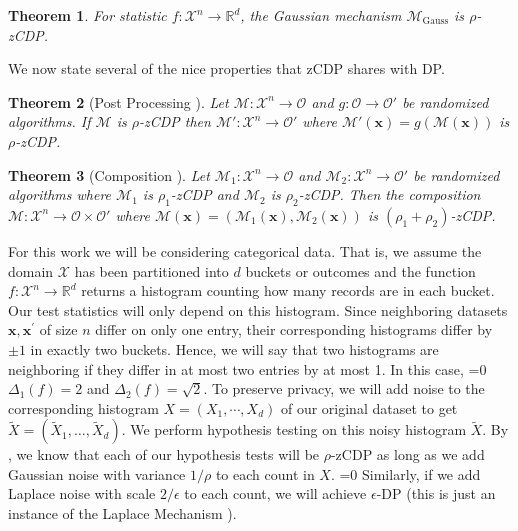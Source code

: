 \documentclass[twoside,letterpaper]{article} \usepackage{aistats2017}
\newtheorem{theorem}{Theorem}[section]
\theoremstyle{definition}
\theoremstyle{remark}
\begin{document}
\begin{theorem}
For statistic $f: {\mathcal{X}}^n \to {\mathbb{R}}^d$, the Gaussian mechanism ${{\mathcal{M}}_{\text{Gauss}}}$ is $\rho$-zCDP.
\label{thm:gauss_mech}
\end{theorem}

We now state several of the nice properties that zCDP shares with DP.  

\begin{theorem}[Post Processing \citep{BS16}]\label{thm:post}
Let ${\mathcal{M}}: {\mathcal{X}}^n \to {\mathcal{O}}$ and $g: {\mathcal{O}} \to {\mathcal{O}}'$ be randomized algorithms.  If ${\mathcal{M}}$ is $\rho$-zCDP then ${\mathcal{M}}': {\mathcal{X}}^n \to {\mathcal{O}}'$ where ${\mathcal{M}}'({\mathbf{x}}) = g({\mathcal{M}}({\mathbf{x}}))$ is $\rho$-zCDP.  
\end{theorem}
\begin{theorem}[Composition \citep{BS16}]
Let ${\mathcal{M}}_1: {\mathcal{X}}^n \to {\mathcal{O}}$ and ${\mathcal{M}}_2: {\mathcal{X}}^n \to {\mathcal{O}}'$ be randomized algorithms where ${\mathcal{M}}_1$ is $\rho_1$-zCDP and ${\mathcal{M}}_2$ is $\rho_2$-zCDP.  Then the composition ${\mathcal{M}}: {\mathcal{X}}^n \to {\mathcal{O}}\times {\mathcal{O}}'$ where ${\mathcal{M}}({\mathbf{x}}) = ({\mathcal{M}}_1({\mathbf{x}}), {\mathcal{M}}_2({\mathbf{x}}))$ is $(\rho_1+\rho_2)$-zCDP.  
\end{theorem}

\fi
For this work we will be considering categorical data. 
That is, we assume the domain ${\mathcal{X}}$ has been partitioned into $d$ buckets or outcomes
and the function $f: {\mathcal{X}}^n \to {\mathbb{R}}^d$ returns a histogram counting how many records are in each bucket. Our test statistics will only depend on this histogram. Since neighboring datasets ${\mathbf{x}}, {\mathbf{x}}^\prime$ of size $n$ differ on only one entry, their corresponding histograms differ by $\pm 1$ in exactly two buckets.  Hence, we will say that two histograms are neighboring if they differ in at most two entries by at most 1.
In this case, =0$ \Delta_1(f) = 2$ and \fi $\Delta_2(f) = \sqrt{2}$.  To preserve privacy, we will add noise to the corresponding histogram $X = (X_1,\cdots, X_d)$ of our original dataset to get $\tilde{X}=(\tilde{X}_1,\dots,\tilde{X}_d)$. We perform hypothesis testing on this noisy histogram $\tilde{X}$.  By , we know that each of our hypothesis tests will be $\rho$-zCDP as long as we add Gaussian noise with variance  $1/\rho$ to each count in $X$.  
=0
Similarly, if we add Laplace noise with scale $2/\epsilon$ to each count, we will achieve $\epsilon$-DP (this is just an instance of the Laplace Mechanism \cite{DMNS06}).
\fi
\end{document}
